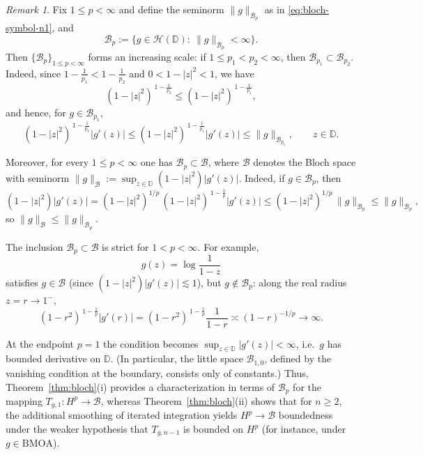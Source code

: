 \documentclass[preprint,12pt]{elsarticle}
\numberwithin{equation}{section}
\theoremstyle{remark}
\newtheorem{remark}{Remark}[section]
\newcommand{\D}{\mathbb{D}}
\begin{document}
\begin{remark}\label{rem:Bp-class}\rm
Fix $1\le p<\infty$ and define the seminorm $\|g\|_{\mathcal B_p}$ as in \eqref{eq:bloch-symbol-n1}, and
\begin{equation*}
\mathcal B_p:=\{g\in\mathcal H(\D):\ \|g\|_{\mathcal B_p}<\infty\}.
\end{equation*}
Then $\{\mathcal B_p\}_{1\le p<\infty}$ forms an increasing scale: if
$1\le p_1<p_2<\infty$, then $\mathcal B_{p_1}\subset \mathcal B_{p_2}$. Indeed, since
$1-\frac1{p_1}<1-\frac1{p_2}$ and $0<1-|z|^2<1$, we have
\begin{equation*}
(1-|z|^2)^{\,1-\frac1{p_2}}\le (1-|z|^2)^{\,1-\frac1{p_1}},
\end{equation*}
and hence, for $g\in\mathcal B_{p_1}$,
\begin{equation*}
(1-|z|^2)^{\,1-\frac1{p_2}}|g'(z)|
\le (1-|z|^2)^{\,1-\frac1{p_1}}|g'(z)|
\le \|g\|_{\mathcal B_{p_1}},
\qquad z\in\D.
\end{equation*}

Moreover, for every $1\le p<\infty$ one has $\mathcal B_p\subset \mathcal B$, where
$\mathcal B$ denotes the Bloch space with seminorm
$\|g\|_{\mathcal B}:=\sup_{z\in\D}(1-|z|^2)|g'(z)|$. Indeed, if $g\in\mathcal B_p$, then
\begin{equation*}
(1-|z|^2)|g'(z)|
=(1-|z|^2)^{1/p}\,(1-|z|^2)^{\,1-\frac1p}|g'(z)|
\le (1-|z|^2)^{1/p}\,\|g\|_{\mathcal B_p}
\le \|g\|_{\mathcal B_p},
\end{equation*}
so $\|g\|_{\mathcal B}\le \|g\|_{\mathcal B_p}$.

The inclusion $\mathcal B_p\subset \mathcal B$ is strict for $1<p<\infty$. For example,
\begin{equation*}
g(z)=\log\frac{1}{1-z}
\end{equation*}
satisfies $g\in\mathcal B$ (since $(1-|z|^2)|g'(z)|\lesssim 1$), but $g\notin\mathcal B_p$:
along the real radius $z=r\to1^-$,
\begin{equation*}
(1-r^2)^{\,1-\frac1p}|g'(r)|
=(1-r^2)^{\,1-\frac1p}\frac{1}{1-r}
\asymp (1-r)^{-1/p}\longrightarrow\infty.
\end{equation*}

At the endpoint $p=1$ the condition becomes $\sup_{z\in\D}|g'(z)|<\infty$, i.e.\ $g$ has
bounded derivative on $\D$. (In particular, the little space $\mathcal B_{1,0}$, defined by the vanishing
condition at the boundary, consists only of constants.)
Thus, Theorem~\ref{thm:bloch}(i) provides a characterization in terms of $\mathcal B_p$
for the mapping $T_{g,1}:H^p\to\mathcal B$, whereas Theorem~\ref{thm:bloch}(ii) shows that for
$n\ge2$, the additional smoothing of iterated integration yields $H^p\to\mathcal B$
boundedness under the weaker hypothesis that $T_{g,n-1}$ is bounded on $H^p$
(for instance, under $g\in\mathrm{BMOA}$).
\end{remark}
\end{document}
